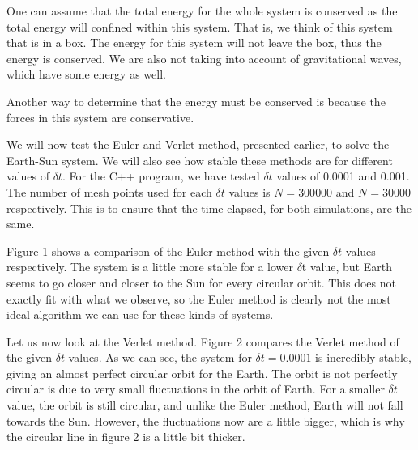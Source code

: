 \documentclass[12pt]{article}
\begin{document}
One can assume that the total energy for the whole system is conserved as the total energy will confined within this system. That is, we think of this system that is in a box. The energy for this system will not leave the box, thus the energy is conserved. We are also not taking into account of gravitational waves, which have some energy as well.

Another way to determine that the energy must be conserved is because the forces in this system are conservative.


We will now test the Euler and Verlet method, presented earlier, to solve the Earth-Sun system. We will also see how stable these methods are for different values of $\delta t$. For the C++ program, we have tested $\delta t$ values of 0.0001 and 0.001. The number of mesh points used for each $\delta t$ values is $N = 300 000$ and $N=30 000$ respectively. This is to ensure that the time elapsed, for both simulations, are the same.

Figure 1 shows a comparison of the Euler method with the given $\delta t$ values respectively. The system is a little more stable for a lower $\delta $t value, but Earth seems to go closer and closer to the Sun for every circular orbit. This does not exactly fit with what we observe, so the Euler method is clearly not the most ideal algorithm we can use for these kinds of systems.

Let us now look at the Verlet method. Figure 2 compares the Verlet method of the given $\delta t$ values. As we can see, the system for $\delta t = 0.0001$ is incredibly stable, giving an almost perfect circular orbit for the Earth. The orbit is not perfectly circular is due to very small fluctuations in the orbit of Earth. For a smaller $\delta t$ value, the orbit is still circular, and unlike the Euler method, Earth will not fall towards the Sun. However, the fluctuations now are a little bigger, which is why the circular line in figure 2 is a little bit thicker. 

\end{document}
